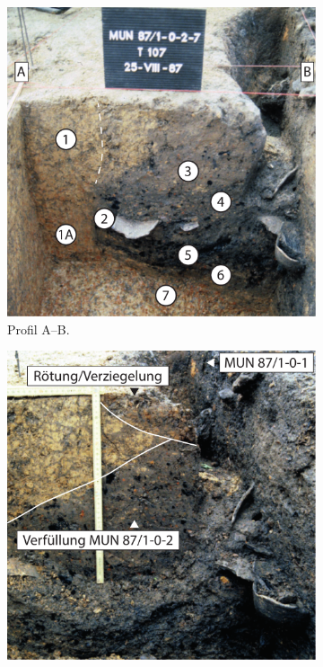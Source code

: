 \begin{figure}[p]
	\begin{minipage}[b]{.55\textwidth}
		\begin{subfigure}[t]{.47\textwidth}
			\centering
			\includegraphics[width = \textwidth]{fig/MUN87-1_3Pl_T40Profil_B.pdf}
			\caption{Profil A--B.}
			\label{fig:MUN87-1_3Pl_T40Profil_B}
		\end{subfigure}\hspace{1em}%
		\begin{subfigure}[t]{.47\textwidth}
			\centering
			\includegraphics[width = \textwidth]{fig/MUN87-1_3Pl_T40Profil_C.pdf}

\end{subfigure}
\end{minipage}
\end{figure}
